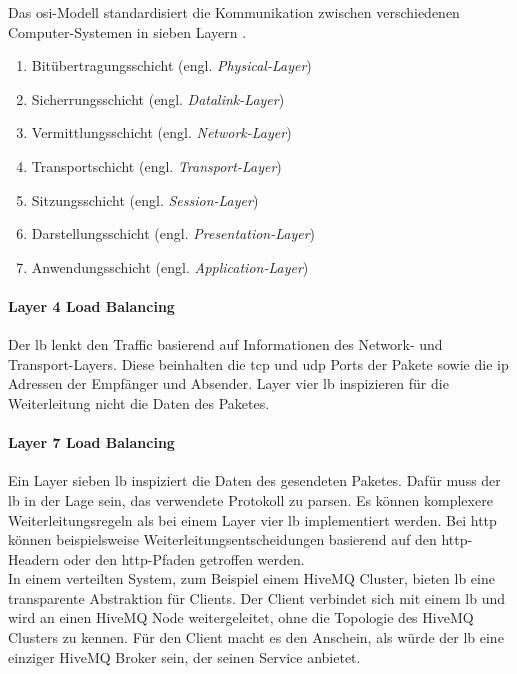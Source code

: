 Das \ac{osi}-Modell standardisiert die Kommunikation zwischen verschiedenen Computer-Systemen in sieben Layern \cite[S.~13ff]{bourkeServerLoadBalancing2001}.
\begin{enumerate}
    \item Bitübertragungsschicht (engl. \textit{Physical-Layer})
    \item Sicherrungsschicht (engl. \textit{Datalink-Layer})
    \item Vermittlungsschicht (engl. \textit{Network-Layer})
    \item Transportschicht (engl. \textit{Transport-Layer})
    \item Sitzungsschicht (engl. \textit{Session-Layer})
    \item Darstellungsschicht (engl. \textit{Presentation-Layer})
    \item Anwendungsschicht (engl. \textit{Application-Layer})
\end{enumerate}
\paragraph{Layer 4 Load Balancing}
Der \ac{lb} lenkt den Traffic basierend auf Informationen des Network- und Transport-Layers. Diese beinhalten die \ac{tcp} und \ac{udp} Ports der Pakete sowie die \ac{ip} Adressen der Empfänger und Absender. Layer vier \acl{lb} inspizieren für die Weiterleitung nicht die Daten des Paketes.
\cite[S.~15]{bourkeServerLoadBalancing2001}

\paragraph{Layer 7 Load Balancing}
Ein Layer sieben \ac{lb} inspiziert die Daten des gesendeten Paketes. Dafür muss der \ac{lb} in der Lage sein, das verwendete Protokoll zu parsen. Es können komplexere Weiterleitungsregeln als bei einem Layer vier \ac{lb} implementiert werden. Bei \ac{http} können beispielsweise Weiterleitungsentscheidungen basierend auf den \ac{http}-Headern oder den \ac{http}-Pfaden getroffen werden.
\cite[S.~15]{WhatLoadBalancer}
\\
In einem verteilten System, zum Beispiel einem HiveMQ Cluster, bieten \acl{lb} eine transparente Abstraktion für Clients. Der Client verbindet sich mit einem \ac{lb} und wird an einen HiveMQ Node weitergeleitet, ohne die Topologie des HiveMQ Clusters zu kennen. Für den Client macht es den Anschein, als würde der \ac{lb} eine einziger HiveMQ Broker sein, der seinen Service anbietet.

